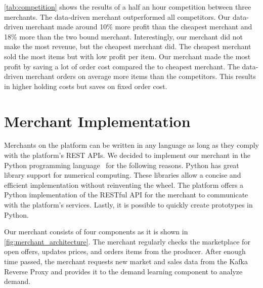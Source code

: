 \cref{tab:competition} shows the results of a half an hour competition between three merchants.
The data-driven merchant outperformed all competitors.
Our data-driven merchant made around 10\% more profit than the cheapest merchant and 18\% more than the two bound merchant.
Interestingly, our merchant did not make the most revenue, but the cheapest merchant did.
The cheapest merchant sold the most items but with low profit per item.
Our merchant made the most profit by saving a lot of order cost compared the to cheapest merchant.
The data-driven merchant orders on average more items than the competitors.
This results in higher holding costs but saves on fixed order cost.


%

\section{Merchant Implementation}
\label{section:merchant_implementation}
Merchants on the \pricewars platform can be written in any language as long as they comply with the platform's REST APIs.
We decided to implement our merchant in the Python programming language~\cite{DBLP:conf/usenix/Rossum07} for the following reasons.
Python has great library support for numerical computing.
These libraries allow a concise and efficient implementation without reinventing the wheel.
The \pricewars platform offers a Python implementation of the RESTful API for the merchant to communicate with the platform's services.
Lastly, it is possible to quickly create prototypes in Python.

Our merchant consists of four components as it is shown in \cref{fig:merchant_architecture}.
The merchant regularly checks the marketplace for open offers, updates prices, and orders items from the producer.
After enough time passed, the merchant requests new market and sales data from the Kafka Reverse Proxy and provides it to the demand learning component to analyze demand.

